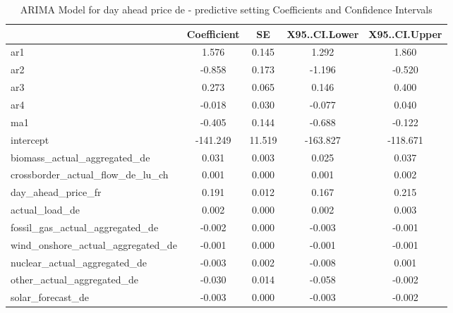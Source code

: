 \begin{table}
\caption{ARIMA Model for day ahead price de - predictive setting Coefficients and Confidence Intervals}
\centering
\begin{tabular}[t]{l|c|c|c|c}
\hline
  & Coefficient & SE & X95..CI.Lower & X95..CI.Upper\\
\hline
ar1 & 1.576 & 0.145 & 1.292 & 1.860\\
\hline
ar2 & -0.858 & 0.173 & -1.196 & -0.520\\
\hline
ar3 & 0.273 & 0.065 & 0.146 & 0.400\\
\hline
ar4 & -0.018 & 0.030 & -0.077 & 0.040\\
\hline
ma1 & -0.405 & 0.144 & -0.688 & -0.122\\
\hline
intercept & -141.249 & 11.519 & -163.827 & -118.671\\
\hline
biomass\_actual\_aggregated\_de & 0.031 & 0.003 & 0.025 & 0.037\\
\hline
crossborder\_actual\_flow\_de\_lu\_ch & 0.001 & 0.000 & 0.001 & 0.002\\
\hline
day\_ahead\_price\_fr & 0.191 & 0.012 & 0.167 & 0.215\\
\hline
actual\_load\_de & 0.002 & 0.000 & 0.002 & 0.003\\
\hline
fossil\_gas\_actual\_aggregated\_de & -0.002 & 0.000 & -0.003 & -0.001\\
\hline
wind\_onshore\_actual\_aggregated\_de & -0.001 & 0.000 & -0.001 & -0.001\\
\hline
nuclear\_actual\_aggregated\_de & -0.003 & 0.002 & -0.008 & 0.001\\
\hline
other\_actual\_aggregated\_de & -0.030 & 0.014 & -0.058 & -0.002\\
\hline
solar\_forecast\_de & -0.003 & 0.000 & -0.003 & -0.002\\
\hline
\end{tabular}
\end{table}\begin{table}


\end{table}
